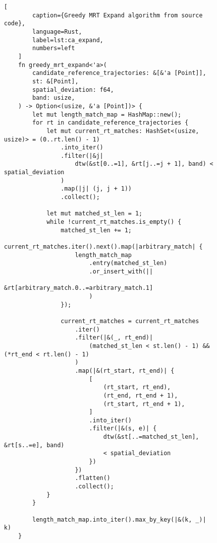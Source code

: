 \begin{figure}[m]
    \begin{lstlisting}[
        caption={Greedy MRT Expand algorithm from source code},
        language=Rust,
        label=lst:ca_expand,
        numbers=left
    ]
    fn greedy_mrt_expand<'a>(
        candidate_reference_trajectories: &[&'a [Point]],
        st: &[Point],
        spatial_deviation: f64,
        band: usize,
    ) -> Option<(usize, &'a [Point])> {
        let mut length_match_map = HashMap::new();
        for rt in candidate_reference_trajectories {
            let mut current_rt_matches: HashSet<(usize, usize)> = (0..rt.len() - 1)
                .into_iter()
                .filter(|&j|
                    dtw(&st[0..=1], &rt[j..=j + 1], band) < spatial_deviation
                )
                .map(|j| (j, j + 1))
                .collect();
    
            let mut matched_st_len = 1;
            while !current_rt_matches.is_empty() {
                matched_st_len += 1;
                current_rt_matches.iter().next().map(|arbitrary_match| {
                    length_match_map
                        .entry(matched_st_len)
                        .or_insert_with(||
                            &rt[arbitrary_match.0..=arbitrary_match.1]
                        )
                });
                
                current_rt_matches = current_rt_matches
                    .iter()
                    .filter(|&(_, rt_end)|
                        (matched_st_len < st.len() - 1) && (*rt_end < rt.len() - 1)
                    )
                    .map(|&(rt_start, rt_end)| {
                        [
                            (rt_start, rt_end),
                            (rt_end, rt_end + 1),
                            (rt_start, rt_end + 1),
                        ]
                        .into_iter()
                        .filter(|&(s, e)| {
                            dtw(&st[..=matched_st_len], &rt[s..=e], band) 
                            < spatial_deviation
                        })
                    })
                    .flatten()
                    .collect();
            }
        }
    
        length_match_map.into_iter().max_by_key(|&(k, _)| k)
    }
    \end{lstlisting}
\end{figure}